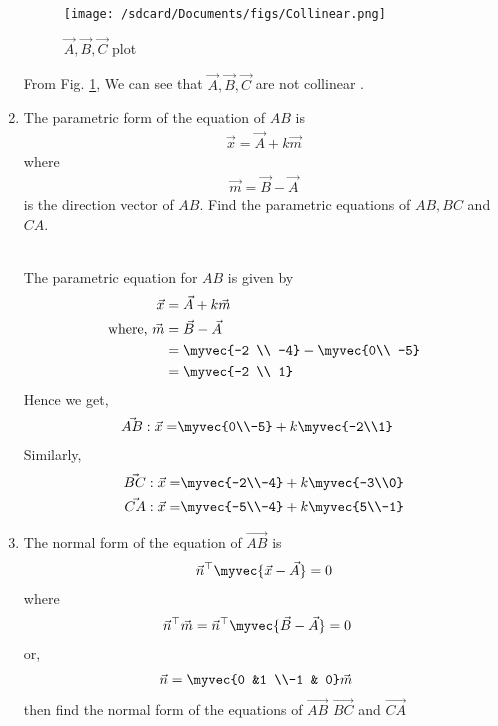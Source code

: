 \documentclass[11pt]{book}
\begin{document}
\begin{enumerate}[label=\thesection.\arabic*.,ref=\thesection.\theenumi]
\begin{figure}[H]
\texttt{[image: /sdcard/Documents/figs/Collinear.png]}
\caption{$\vec{A},\vec{B},\vec{C}$ plot}
\label{fig1:Triangle}
\end{figure}

From Fig. \ref{fig1:Triangle}, We can see that $\vec{A},\vec{B},\vec{C}$ are not collinear .

\item The parametric form of the equation of $AB$ is
	\begin{align}
		\vec{x}=\vec{A}+k\vec{m}
	\end{align}
	where\\
	\begin{align}
		\vec{m} = \vec{B} - \vec{A}
	\end{align}
	is the direction vector of $AB$.
	Find the parametric equations of $AB,BC$ and $CA$.

	\solution\\
	The parametric equation for $AB$ is given by
	\begin{align}
		\vec{x} &= \vec{A} + k\vec{m}\\
		\text{where, } \vec{m} &= \vec{B} -\vec{A}\\
		&= \myvec{-2 \\ -4} -\myvec{0\\ -5}\\
		&= \myvec{-2 \\ 1}
	\end{align}
	Hence we get,
	\begin{align}
		\vec{AB}: \vec{x} = &\myvec{0\\-5} + k \myvec{-2\\1}
	\end{align}
	Similarly, 
	\begin{align}
		\vec{BC}: \vec{x} = &\myvec{-2\\-4} + k \myvec{-3\\0}\\
		\vec{CA}: \vec{x} = &\myvec{-5\\-4} + k \myvec{5\\-1}
	\end{align}

\item The normal form of the equation of $\vec{AB}$ is
\begin{align}
\vec{n}^{\top}\myvec{\vec{x}-\vec{A}}=0
\end{align}
where
\begin{align}
\vec{n}^{\top}\vec{m}&=\vec{n}^{\top}\myvec{\vec{B}-\vec{A}}=0
\end{align} 
or,\begin{align}
\vec{n}&=\myvec{0 &1 \\-1 & 0}\vec{m}
\end{align}
then find the normal form of the equations of $\vec{AB}$ $\vec{BC}$ and $\vec{CA}$


\end{enumerate}
\end{document}

